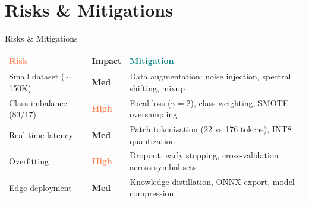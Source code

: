 \documentclass[aspectratio=169, 10pt]{beamer}
\begin{document}
\section{Risks \& Mitigations}
\begin{frame}{Risks \& Mitigations}
\footnotesize
\renewcommand{\arraystretch}{1.35}
\begin{center}
\begin{tabular}{@{}
  p{3cm}
  >{\centering\arraybackslash}p{1.3cm}
  p{7.5cm}@{}}
\toprule
\textbf{\textcolor{coral}{Risk}} & \textbf{Impact} & \textbf{\textcolor{teal}{Mitigation}} \\
\midrule
\rowcolor{lightbg}
Small dataset ($\sim$150K) &
\textcolor{amber}{\textbf{Med}} &
Data augmentation: noise injection, spectral shifting, mixup \\

Class imbalance (83/17) &
\textcolor{coral}{\textbf{High}} &
Focal loss ($\gamma\!=\!2$), class weighting, SMOTE oversampling \\

\rowcolor{lightbg}
Real-time latency &
\textcolor{amber}{\textbf{Med}} &
Patch tokenization (22 vs 176 tokens), INT8 quantization \\

Overfitting &
\textcolor{coral}{\textbf{High}} &
Dropout, early stopping, cross-validation across symbol sets \\

\rowcolor{lightbg}
Edge deployment &
\textcolor{amber}{\textbf{Med}} &
Knowledge distillation, ONNX export, model compression \\
\bottomrule
\end{tabular}
\end{center}
\end{frame}


\end{document}
